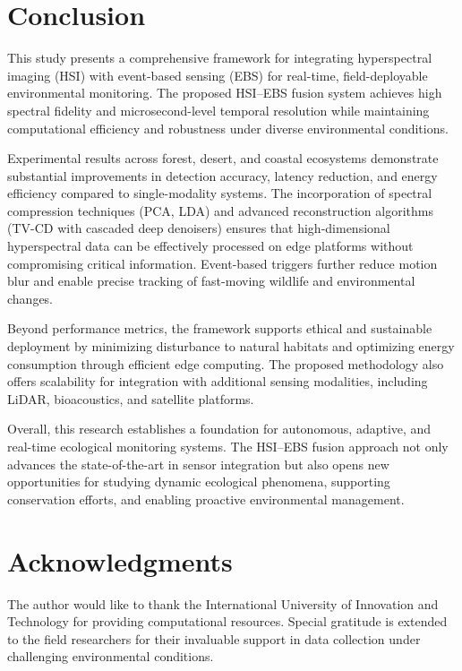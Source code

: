 \documentclass[conference]{IEEEtran}
\begin{document}
\section{Conclusion}
This study presents a comprehensive framework for integrating hyperspectral imaging (HSI) with event-based sensing (EBS) for real-time, field-deployable environmental monitoring. The proposed HSI–EBS fusion system achieves high spectral fidelity and microsecond-level temporal resolution while maintaining computational efficiency and robustness under diverse environmental conditions.  

Experimental results across forest, desert, and coastal ecosystems demonstrate substantial improvements in detection accuracy, latency reduction, and energy efficiency compared to single-modality systems. The incorporation of spectral compression techniques (PCA, LDA) and advanced reconstruction algorithms (TV-CD with cascaded deep denoisers) ensures that high-dimensional hyperspectral data can be effectively processed on edge platforms without compromising critical information. Event-based triggers further reduce motion blur and enable precise tracking of fast-moving wildlife and environmental changes.  

Beyond performance metrics, the framework supports ethical and sustainable deployment by minimizing disturbance to natural habitats and optimizing energy consumption through efficient edge computing. The proposed methodology also offers scalability for integration with additional sensing modalities, including LiDAR, bioacoustics, and satellite platforms.  

Overall, this research establishes a foundation for autonomous, adaptive, and real-time ecological monitoring systems. The HSI–EBS fusion approach not only advances the state-of-the-art in sensor integration but also opens new opportunities for studying dynamic ecological phenomena, supporting conservation efforts, and enabling proactive environmental management.


\section*{Acknowledgments}
The author would like to thank the International University of Innovation and Technology for providing computational resources. Special gratitude is extended to the field researchers for their invaluable support in data collection under challenging environmental conditions.
\end{document}
